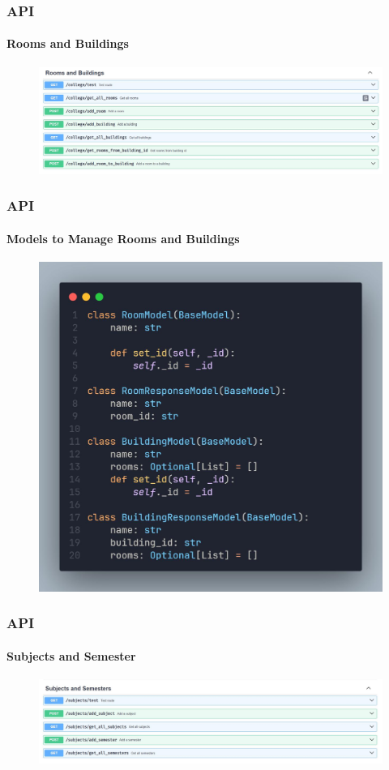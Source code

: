 \documentclass[aspectratio=169]{beamer}
\begin{document}
\begin{frame}
	\centering
	\frametitle{API}
	\framesubtitle{Rooms and Buildings}
	\begin{minipage}{0.95\textwidth}
		\begin{figure}[H]
			\centering
			\includegraphics[width=.95\textwidth]{swagger 5.jpg}
		\end{figure}
	\end{minipage}
\end{frame}


\begin{frame}
	\centering
	\frametitle{API}
	\framesubtitle{Models to Manage Rooms and Buildings}
	\begin{minipage}{0.95\textwidth}
		\begin{figure}[H]
			\centering
			\includegraphics[width=.55\textwidth]{college.jpg}
		\end{figure}
	\end{minipage}
\end{frame}


\begin{frame}
	\centering
	\frametitle{API}
	\framesubtitle{Subjects and Semester}
	\begin{minipage}{0.95\textwidth}
		\begin{figure}[H]
			\centering
			\includegraphics[width=.95\textwidth]{swagger 6.jpg}
		\end{figure}
	\end{minipage}
\end{frame}
\end{document}
